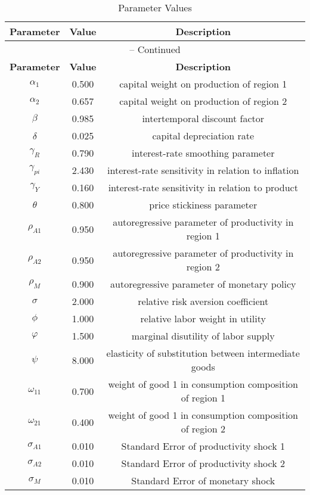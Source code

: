 \begin{center}
\begin{longtable}{ccc}
\caption{Parameter Values}\\%
\toprule%
\multicolumn{1}{c}{\textbf{Parameter}} &
\multicolumn{1}{c}{\textbf{Value}} &
 \multicolumn{1}{c}{\textbf{Description}}\\%
\midrule%
\endfirsthead
\multicolumn{3}{c}{{\tablename} \thetable{} -- Continued}\\%
\midrule%
\multicolumn{1}{c}{\textbf{Parameter}} &
\multicolumn{1}{c}{\textbf{Value}} &
  \multicolumn{1}{c}{\textbf{Description}}\\%
\midrule%
\endhead
${\alpha_{1}}$ 	 & 	 0.500 	 & 	 capital weight on production of region 1\\
${\alpha_{2}}$ 	 & 	 0.657 	 & 	 capital weight on production of region 2\\
${\beta}$ 	 & 	 0.985 	 & 	 intertemporal discount factor\\
${\delta}$ 	 & 	 0.025 	 & 	 capital depreciation rate\\
${\gamma_{R}}$ 	 & 	 0.790 	 & 	 interest-rate smoothing parameter\\
${\gamma_{pi}}$ 	 & 	 2.430 	 & 	 interest-rate sensitivity in relation to inflation\\
${\gamma_{Y}}$ 	 & 	 0.160 	 & 	 interest-rate sensitivity in relation to product\\
${\theta}$ 	 & 	 0.800 	 & 	 price stickiness parameter\\
${\rho_{A1}}$ 	 & 	 0.950 	 & 	 autoregressive parameter of productivity in region 1\\
${\rho_{A2}}$ 	 & 	 0.950 	 & 	 autoregressive parameter of productivity in region 2\\
${\rho_{M}}$ 	 & 	 0.900 	 & 	 autoregressive parameter of monetary policy\\
${\sigma}$ 	 & 	 2.000 	 & 	 relative risk aversion coefficient\\
${\phi}$ 	 & 	 1.000 	 & 	 relative labor weight in utility\\
${\varphi}$ 	 & 	 1.500 	 & 	 marginal disutility of labor supply\\
${\psi}$ 	 & 	 8.000 	 & 	 elasticity of substitution between intermediate goods\\
${\omega_{11}}$ 	 & 	 0.700 	 & 	 weight of good 1 in consumption composition of region 1\\
${\omega_{21}}$ 	 & 	 0.400 	 & 	 weight of good 1 in consumption composition of region 2\\
${\sigma_{A1}}$ 	 & 	 0.010 	 & 	 Standard Error of productivity shock 1\\
${\sigma_{A2}}$ 	 & 	 0.010 	 & 	 Standard Error of productivity shock 2\\
${\sigma_M}$ 	 & 	 0.010 	 & 	 Standard Error of monetary shock\\
\bottomrule%
\end{longtable}
\end{center}
